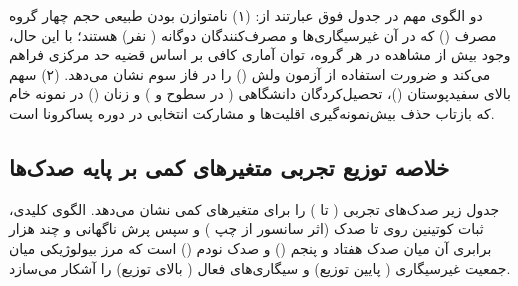 \documentclass[12pt]{exam}
\begin{document}
دو الگوی مهم در جدول فوق عبارتند از: (۱) نامتوازن بودن طبیعی حجم چهار گروه مصرف () که در آن غیرسیگاری‌ها  و مصرف‌کنندگان دوگانه  ( نفر) هستند؛ با این حال، وجود بیش از  مشاهده در هر گروه، توان آماری کافی بر اساس قضیه حد مرکزی فراهم می‌کند و ضرورت استفاده از آزمون ولش () را در فاز سوم نشان می‌دهد. (۲) سهم بالای سفیدپوستان ()، تحصیل‌کردگان دانشگاهی ( در سطوح  و ) و زنان () در نمونه خام که بازتاب حذف بیش‌نمونه‌گیری اقلیت‌ها و مشارکت انتخابی در دوره پساکرونا است.

\subsection{خلاصه توزیع تجربی متغیرهای کمی بر پایه صدک‌ها}
جدول زیر صدک‌های تجربی ( تا ) را برای متغیرهای کمی نشان می‌دهد. الگوی کلیدی، ثبات کوتینین روی  تا صدک  (اثر سانسور از چپ ) و سپس پرش ناگهانی و چند هزار برابری آن میان صدک هفتاد و پنجم () و صدک نودم () است که مرز بیولوژیکی میان جمعیت غیرسیگاری ( پایین توزیع) و سیگاری‌های فعال ( بالای توزیع) را آشکار می‌سازد.
\end{document}
